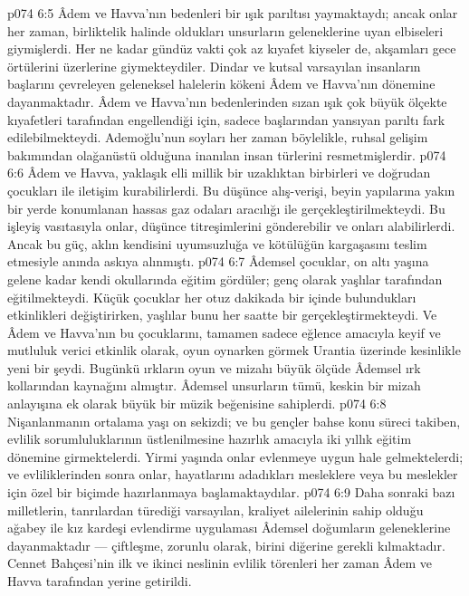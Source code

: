 \vs p074 6:5 Âdem ve Havva’nın bedenleri bir ışık parıltısı yaymaktaydı; ancak onlar her zaman, birliktelik halinde oldukları unsurların geleneklerine uyan elbiseleri giymişlerdi. Her ne kadar gündüz vakti çok az kıyafet kiyseler de, akşamları gece örtülerini üzerlerine giymekteydiler. Dindar ve kutsal varsayılan insanların başlarını çevreleyen geleneksel halelerin kökeni Âdem ve Havva’nın dönemine dayanmaktadır. Âdem ve Havva’nın bedenlerinden sızan ışık çok büyük ölçekte kıyafetleri tarafından engellendiği için, sadece başlarından yansıyan parıltı fark edilebilmekteydi. Ademoğlu’nun soyları her zaman böylelikle, ruhsal gelişim bakımından olağanüstü olduğuna inanılan insan türlerini resmetmişlerdir.
\vs p074 6:6 Âdem ve Havva, yaklaşık elli millik bir uzaklıktan birbirleri ve doğrudan çocukları ile iletişim kurabilirlerdi. Bu düşünce alış\hyp{}verişi, beyin yapılarına yakın bir yerde konumlanan hassas gaz odaları aracılığı ile gerçekleştirilmekteydi. Bu işleyiş vasıtasıyla onlar, düşünce titreşimlerini gönderebilir ve onları alabilirlerdi. Ancak bu güç, aklın kendisini uyumsuzluğa ve kötülüğün kargaşasını teslim etmesiyle anında askıya alınmıştı.
\vs p074 6:7 Âdemsel çocuklar, on altı yaşına gelene kadar kendi okullarında eğitim gördüler; genç olarak yaşlılar tarafından eğitilmekteydi. Küçük çocuklar her otuz dakikada bir içinde bulundukları etkinlikleri değiştirirken, yaşlılar bunu her saatte bir gerçekleştirmekteydi. Ve Âdem ve Havva’nın bu çocuklarını, tamamen sadece eğlence amacıyla keyif ve mutluluk verici etkinlik olarak, oyun oynarken görmek Urantia üzerinde kesinlikle yeni bir şeydi. Bugünkü ırkların oyun ve mizahı büyük ölçüde Âdemsel ırk kollarından kaynağını almıştır. Âdemsel unsurların tümü, keskin bir mizah anlayışına ek olarak büyük bir müzik beğenisine sahiplerdi.
\vs p074 6:8 Nişanlanmanın ortalama yaşı on sekizdi; ve bu gençler bahse konu süreci takiben, evlilik sorumluluklarının üstlenilmesine hazırlık amacıyla iki yıllık eğitim dönemine girmektelerdi. Yirmi yaşında onlar evlenmeye uygun hale gelmektelerdi; ve evliliklerinden sonra onlar, hayatlarını adadıkları mesleklere veya bu meslekler için özel bir biçimde hazırlanmaya başlamaktaydılar.
\vs p074 6:9 Daha sonraki bazı milletlerin, tanrılardan türediği varsayılan, kraliyet ailelerinin sahip olduğu ağabey ile kız kardeşi evlendirme uygulaması Âdemsel doğumların geleneklerine dayanmaktadır --- çiftleşme, zorunlu olarak, birini diğerine gerekli kılmaktadır. Cennet Bahçesi’nin ilk ve ikinci neslinin evlilik törenleri her zaman Âdem ve Havva tarafından yerine getirildi.
